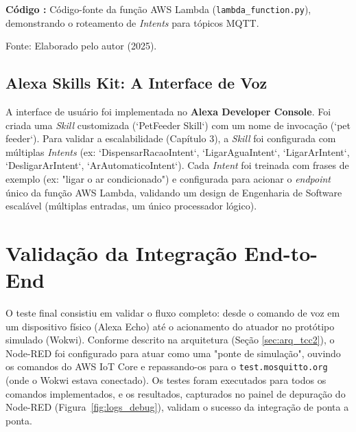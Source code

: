 \begin{center}
    \textbf{Código \thecodigo:} Código-fonte da função AWS Lambda (\texttt{lambda\_function.py}), demonstrando o roteamento de \textit{Intents} para tópicos MQTT.
    \label{fig:codigo_lambda} 
    
    \vspace{0.2cm} 
    \small{Fonte: Elaborado pelo autor (2025).}
\end{center}





\subsection{Alexa Skills Kit: A Interface de Voz}
A interface de usuário foi implementada no \textbf{Alexa Developer Console}.
Foi criada uma \textit{Skill} customizada (`PetFeeder Skill`) com um nome de invocação (`pet feeder`).
Para validar a escalabilidade (Capítulo 3), a \textit{Skill} foi configurada com múltiplas \textit{Intents} (ex: `DispensarRacaoIntent`, `LigarAguaIntent`, `LigarArIntent`, `DesligarArIntent`, `ArAutomaticoIntent`).
Cada \textit{Intent} foi treinada com frases de exemplo (ex: "ligar o ar condicionado") e configurada para acionar o \textit{endpoint} único da função AWS Lambda, validando um design de Engenharia de Software escalável (múltiplas entradas, um único processador lógico).
\section{Validação da Integração End-to-End}
O teste final consistiu em validar o fluxo completo: desde o comando de voz em um dispositivo físico (Alexa Echo) até o acionamento do atuador no protótipo simulado (Wokwi).
Conforme descrito na arquitetura (Seção \ref{sec:arq_tcc2}), o Node-RED foi configurado para atuar como uma "ponte de simulação", ouvindo os comandos do AWS IoT Core e repassando-os para o \texttt{test.mosquitto.org} (onde o Wokwi estava conectado).
Os testes foram executados para todos os comandos implementados, e os resultados, capturados no painel de depuração do Node-RED (Figura~\ref{fig:logs_debug}), validam o sucesso da integração de ponta a ponta.




